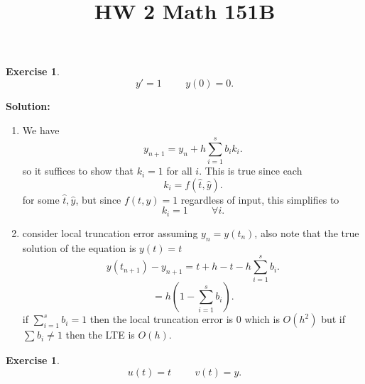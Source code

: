 \documentclass[a4paper,12pt]{scrartcl} %
\newenvironment{solution}
  {\par\color{answercolor}\textbf{Solution:}\ }
  {\par}
\newcounter{customcounter}
\theoremstyle{darktheorem}
\newtheorem{exercise}[customcounter]{Exercise}
\begin{document}
\title{\color{sectioncolor}HW 2 Math 151B}
\author{}
\date{}
\maketitle

\thispagestyle{fancy}

\begin{exercise}
    \[
        y' = 1 \hspace{1cm} y(0) = 0
    .\] 
\end{exercise}
\begin{solution}
    \begin{enumerate}
        \item
        We have
        \[
            y_{n+1} = y_n + h \sum_{i=1}^{s}b_ik_i
        .\] 
        so it suffices to show that $k_i = 1$ for all $i$. This is true since each
        \[
        k_i = f(\hat t, \hat y)
        .\] 
        for some $\hat t, \hat y$, but since  $f(t,y) = 1$ regardless of input, this simplifies to
        \[
            k_i = 1 \hspace{1cm} \forall i
        .\] 
        \item
            consider local truncation error assuming $y_n = y(t_n)$, also note that the true solution of the equation is  $y(t) = t$
            \[
                y(t_{n+1}) - y_{n+1} = t + h - t - h \sum_{i=1}^{s}b_i
            .\] 
            \[
            = h(1-\sum_{i=1}^{s}b_i)
            .\] 
            if $\sum_{i=1}^{s}b_i = 1$ then the local truncation error is $0$ which is $O(h^2)$ but if $\sum_{}^{}b_i \ne 1$ then the LTE is $O(h)$.
    \end{enumerate}
\end{solution}
\begin{exercise}
    \[
        u(t) = t \hspace{1cm} v(t) = y
    .\] 
\end{exercise}
\end{document}
